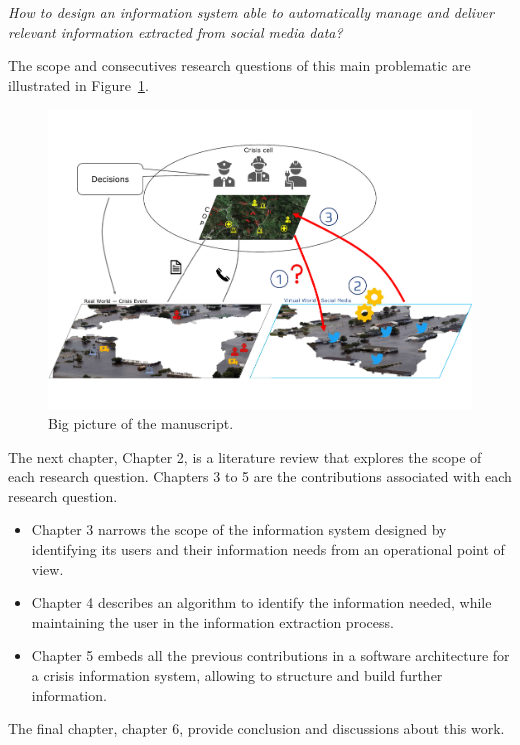 \emph{How to design an information system able to automatically manage and deliver relevant information extracted from social media data?}

The scope and consecutives research questions of this main problematic are illustrated in Figure~\ref{context:big-picture}.

\begin{landscape}
    \begin{figure}
        \includegraphics[width=\paperwidth,height=\paperheight,keepaspectratio]{figures/chap-1/big-picture.pdf}
        \caption{Big picture of the manuscript.}
        \label{context:big-picture}
    \end{figure}
\end{landscape}

The next chapter, Chapter 2, is a literature review that explores the scope of each research question.
Chapters 3 to 5 are the contributions associated with each research question.

\begin{itemize}
    \item Chapter 3 narrows the scope of the information system designed by identifying its users and their information needs from an operational point of view.
    \item Chapter 4 describes an algorithm to identify the information needed, while maintaining the user in the information extraction process.
    \item Chapter 5 embeds all the previous contributions in a software architecture for a crisis information system, allowing to structure and build further information.
\end{itemize}

The final chapter, chapter 6, provide conclusion and discussions about this work.

